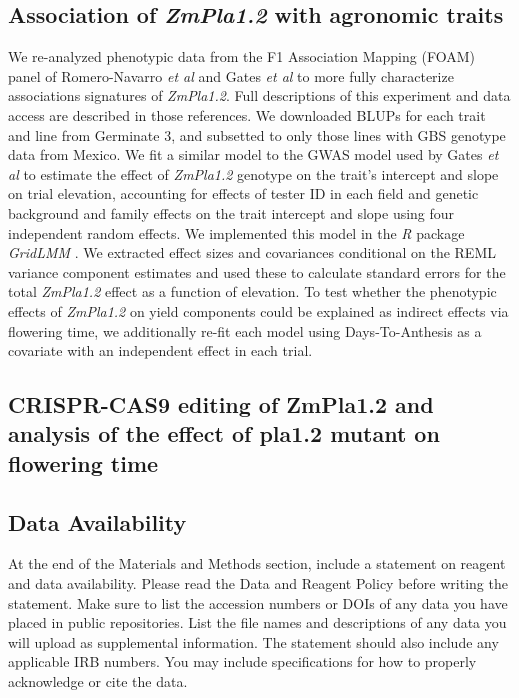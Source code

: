 \documentclass[9pt,twocolumn,twoside,lineno]{gsajnl}
\begin{document}
\subsection{Association of \textit{ZmPla1.2} with agronomic traits}
We re-analyzed phenotypic data from the F1 Association Mapping (FOAM) panel of Romero-Navarro \textit{et al} \cite{Romero_Navarro2017-cn} and Gates \textit{et al} \cite{Gates2019-xu} to more fully characterize associations signatures of \textit{ZmPla1.2}. 
Full descriptions of this experiment and data access are described in those references. 
We downloaded BLUPs for each trait and line from Germinate 3, and subsetted to only those lines with GBS genotype data from Mexico. 
We fit a similar model to the GWAS model used by Gates \textit{et al} \cite{Gates2019-xu} to estimate the effect of \textit{ZmPla1.2} genotype on the trait's intercept and slope on trial elevation, accounting for effects of tester ID in each field and genetic background and family effects on the trait intercept and slope using four independent random effects. 
We implemented this model in the \textit{R} package \textit{GridLMM} \cite{GridLMM2019}. 
We extracted effect sizes and covariances conditional on the REML variance component estimates and used these to calculate standard errors for the total \textit{ZmPla1.2} effect as a function of elevation. 
To test whether the phenotypic effects of \textit{ZmPla1.2} on yield components could be explained as indirect effects via flowering time, we additionally re-fit each model using Days-To-Anthesis as a covariate with an independent effect in each trial.

\subsection{CRISPR-CAS9 editing of ZmPla1.2 and analysis of the effect of pla1.2 mutant on flowering time}

\subsection{Data Availability}

At the end of the Materials and Methods section, include a statement on reagent and data availability. Please read the Data and Reagent Policy before writing the statement. Make sure to list the accession numbers or DOIs of any data you have placed in public repositories. List the file names and descriptions of any data you will upload as supplemental information. The statement should also include any applicable IRB numbers. You may include specifications for how to properly acknowledge or cite the data.
\end{document}
